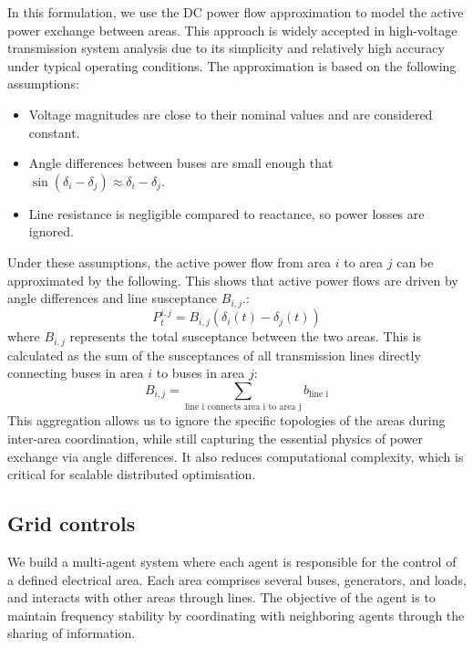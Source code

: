 \documentclass{article}
\begin{document}
In this formulation, we use the DC power flow approximation to model the active power exchange between areas. This approach is widely accepted in high-voltage transmission system analysis due to its simplicity and relatively high accuracy under typical operating conditions. The approximation is based on the following assumptions:
\begin{itemize}
    \item Voltage magnitudes are close to their nominal values and are considered constant.
    \item Angle differences between buses are small enough that $\sin(\delta_i - \delta_j) \approx \delta_i - \delta_j$.
    \item Line resistance is negligible compared to reactance, so power losses are ignored.
\end{itemize}
Under these assumptions, the active power flow from area $i$ to area $j$ can be approximated by the following. This shows that active power flows are driven by angle differences and line susceptance $B_{i,j}$.:
\begin{equation}
    P^{i,j}_t = B_{i,j}(\delta_i(t) - \delta_j(t))
\end{equation}
where $B_{i,j}$ represents the total susceptance between the two areas. This is calculated as the sum of the susceptances of all transmission lines directly connecting buses in area $i$ to buses in area $j$:
\begin{equation}
    B_{i,j} = \sum_{\text{line i connects area i to area j}} b_{\text{line i}}
\end{equation}
This aggregation allows us to ignore the specific topologies of the areas during inter-area coordination, while still capturing the essential physics of power exchange via angle differences. It also reduces computational complexity, which is critical for scalable distributed optimisation.

\subsection{Grid controls}
We build a multi-agent system where each agent is responsible for the control of a defined electrical area. Each area comprises several buses, generators, and loads, and interacts with other areas through lines. The objective of the agent is to maintain frequency stability by coordinating with neighboring agents through the sharing of information. 
\end{document}

